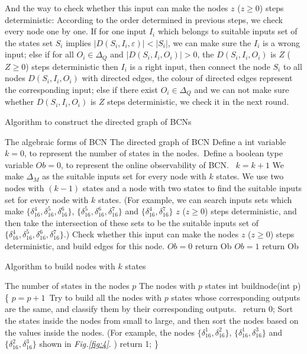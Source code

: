 \documentclass[conference]{IEEEtran} %
\begin{document}
And the way to check whether this input can make the nodes $z$ ($z\ge0$) steps deterministic: According to the order determined in previous steps, we check every node one by one. If for one input $I_i$ which belongs to suitable inputs set of the states set $S_i$ implies $|D\left(S_i,I_i,\varepsilon\right)|<|S_i|$, we can make sure the $I_i$ is a wrong input; else if for all $O_i \in \Delta_Q$ and $|D\left(S_i,I_i,O_i\right)|>0$, the $D\left(S_i,I_i,O_i\right)$ is $Z$ ($Z\ge 0$) steps deterministic then $I_i$ is a right input, then connect the node $S_i$ to all nodes $D\left(S_i,I_i,O_i\right)$ with directed edges, the colour of directed edges represent the corresponding input; else if there exist $O_i \in \Delta_Q$ and we can not make sure whether $D\left(S_i,I_i,O_i\right)$ is $Z$ steps deterministic, we check it in the next round. 
\begin{algorithm}[h]
\caption{Algorithm to construct the directed graph of BCNs}
\begin{algorithmic}[1]
\REQUIRE 
The algebraic forms of BCN
\ENSURE  
The directed graph of BCN
\STATE Define a int variable $k=0$, to represent the number of states in the nodes.\
\STATE Define a boolean type variable $Ob=0$, to represent the online observability of BCN.\
\STATE $k= k+1$
\STATE We make $\Delta_M$ as the suitable inputs set for every node with $k$ states.
\ELSE
\IF{$k>2$}
\STATE We use two nodes with $(k-1)$ states and a node with two states to find the suitable inputs set for every node with $k$ states. (For example, we can search inputs sets which make $\{\delta_{16}^4,\delta_{16}^5,\delta_{16}^6\}$, $\{\delta_{16}^5,\delta_{16}^6,\delta_{16}^7\}$ and $\{\delta_{16}^4,\delta_{16}^7\}$ $z$ ($z\ge0$) steps deterministic, and then take the intersection of these sets to be the suitable inputs set of $\{\delta_{16}^4,\delta_{16}^5,\delta_{16}^6,\delta_{16}^7\}$.) 
\ENDIF
\ENDIF
{}
\STATE Check whether this input can make the nodes $z$ ($z\ge0$) steps deterministic, and build edges for this node.
\ENDFOR
\ENDFOR
{}
\STATE $Ob=0$ return Ob
\ENDIF
\ENDWHILE
\STATE $Ob=1$ return Ob
\end{algorithmic}
\end{algorithm}
\begin{algorithm}[h]
\caption{Algorithm to build nodes with $k$ states}
\begin{algorithmic}[1]
\REQUIRE 
The number of states in the nodes $p$
\ENSURE  
The nodes with $p$ states
\STATE int buildnode(int p)
\STATE  \{ 
\STATE $p=p+1$\
\STATE  Try to build all the nodes with $p$ states whose corresponding outputs are the same, and classify them by their corresponding outputs.\
\STATE  return 0;
\ELSE 
\STATE Sort the states inside the nodes from small to large, and then sort the nodes based on the values inside the nodes. (For example, the nodes $\{\delta_{16}^1,\delta_{16}^2\}$, $\{\delta_{16}^1,\delta_{16}^3\}$ and $\{\delta_{16}^2,\delta_{16}^3\}$ shown in {\em Fig.\ref{fig:4}}. )
\STATE return 1;
\ENDIF 
\STATE \}
\end{algorithmic}
\end{algorithm}
\end{document}
